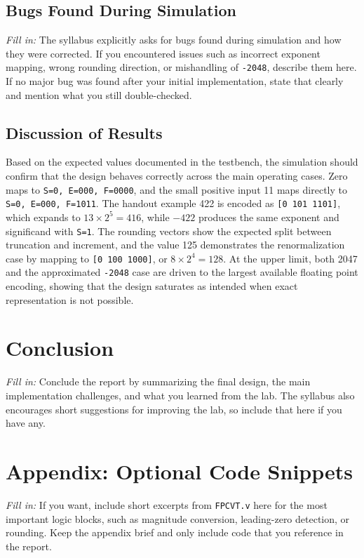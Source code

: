 \documentclass[10pt,letterpaper]{article}
\begin{document}
\subsection{Bugs Found During Simulation}

\textit{Fill in:} The syllabus explicitly asks for bugs found during simulation and how they were corrected. If you encountered issues such as incorrect exponent mapping, wrong rounding direction, or mishandling of \texttt{-2048}, describe them here. If no major bug was found after your initial implementation, state that clearly and mention what you still double-checked.

\subsection{Discussion of Results}

Based on the expected values documented in the testbench, the simulation should confirm that the design behaves correctly across the main operating cases. Zero maps to \texttt{S=0, E=000, F=0000}, and the small positive input 11 maps directly to \texttt{S=0, E=000, F=1011}. The handout example 422 is encoded as \texttt{[0 101 1101]}, which expands to $13 \times 2^5 = 416$, while $-422$ produces the same exponent and significand with \texttt{S=1}. The rounding vectors show the expected split between truncation and increment, and the value 125 demonstrates the renormalization case by mapping to \texttt{[0 100 1000]}, or $8 \times 2^4 = 128$. At the upper limit, both 2047 and the approximated \texttt{-2048} case are driven to the largest available floating point encoding, showing that the design saturates as intended when exact representation is not possible.

\section{Conclusion}

\textit{Fill in:} Conclude the report by summarizing the final design, the main implementation challenges, and what you learned from the lab. The syllabus also encourages short suggestions for improving the lab, so include that here if you have any.

\section*{Appendix: Optional Code Snippets}

\textit{Fill in:} If you want, include short excerpts from \texttt{FPCVT.v} here for the most important logic blocks, such as magnitude conversion, leading-zero detection, or rounding. Keep the appendix brief and only include code that you reference in the report.
\end{document}

